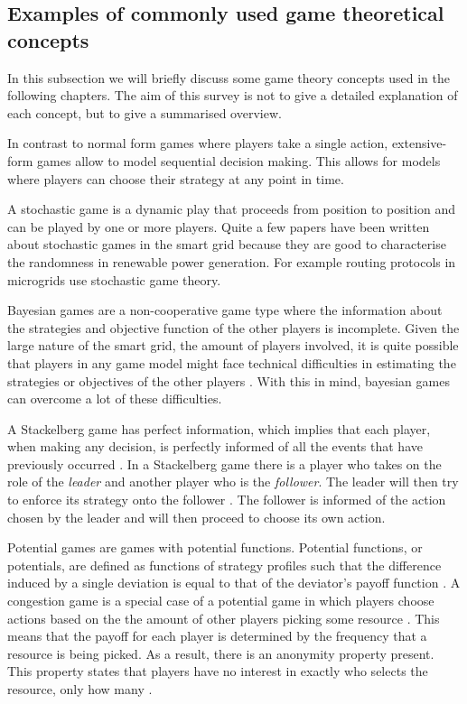 \subsection{Examples of commonly used game theoretical concepts}
In this subsection we will briefly discuss some game theory concepts used in the following chapters. The aim of this survey is not to give a detailed explanation of each concept, but to give a summarised overview.

In contrast to normal form games where players take a single action, extensive-form games allow to model sequential decision making. This allows for models where players can choose their strategy at any point in time.

A stochastic game is a dynamic play that proceeds from position to position \cite{Shapley1953} and can be played by one or more players. Quite a few papers have been written about stochastic games in the smart grid \cite{LiangZhuang2014,nguyen2013game} because they are good to characterise the randomness in renewable power generation. For example routing protocols in microgrids use stochastic game theory.

Bayesian games are a non-cooperative game type where the information about the strategies and objective function of the other players is incomplete. Given the large nature of the smart grid, the amount of players involved, it is quite possible that players in any game model might face technical difficulties in estimating the strategies or objectives of the other players \cite{keypaper}. With this in mind, bayesian games can overcome a lot of these difficulties.

A Stackelberg game has perfect information, which implies that each player, when making any decision, is perfectly informed of all the events that have previously occurred \cite{CourseInGameTheory}.
In a Stackelberg game there is a player who takes on the role of the \textit{leader} and another player who is the \textit{follower}. The leader will then try to enforce its strategy onto the follower \cite{ShohamLeyton-Brown2008}. The follower is informed of the action chosen by the leader and will then proceed to choose its own action. 

Potential games are games with potential functions. Potential functions, or potentials, are defined as functions of strategy profiles such that the difference induced by a single deviation is equal to that of the deviator’s payoff function \cite{MondererShapley1996, ui2000shapley}. A congestion game is a special case of a potential game in which players choose actions based on the the amount of other players picking some resource \cite{IbarsNavarroGiupponi2010,ShohamLeyton-Brown2008}. This means that the payoff for each player is determined by the frequency that a resource is being picked. As a result, there is an anonymity property present. This property states that players have no interest in exactly who selects the resource, only how many \cite{ShohamLeyton-Brown2008}.

